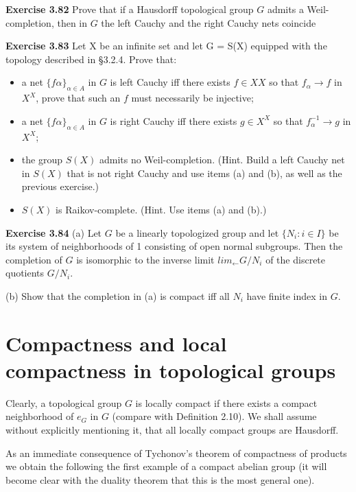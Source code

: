 \documentclass[12pt]{article}
\begin{document}
\textbf{Exercise 3.82} Prove that if a Hausdorff topological group $G$ admits a Weil-completion, then in $G$ the left
Cauchy and the right Cauchy nets coincide


\textbf{Exercise 3.83} Let X be an infinite set and let G = S(X) equipped with the topology described in §3.2.4. Prove
that:


\begin{itemize}

    \item a net  $\{f\alpha\}_{\alpha \in A}$ in $G$ is left Cauchy iff there exists $f \in XX$ so that $f_\alpha \to f$ in $X^X$, prove that such an $f$
    must necessarily be injective;
    
    \item  a net $\{f\alpha\}_{\alpha \in A}$ in $G$ is right Cauchy iff there exists $g \in X^X$ so that $f^{-1}_\alpha\to g$ in $X^X$;

    \item  the group $S(X)$ admits no Weil-completion. (Hint. Build a left Cauchy net in $S(X)$ that is not right
    Cauchy and use items (a) and (b), as well as the previous exercise.)

    \item $S(X)$ is Raikov-complete. (Hint. Use items (a) and (b).)
    

\end{itemize}


\textbf{Exercise 3.84} (a) Let $G$ be a linearly topologized group and let $\{N_i: i \in I\}$ be its system of neighborhoods
of 1 consisting of open normal subgroups. Then the completion of $G$ is isomorphic to the inverse limit
$lim_{\leftarrow} G/N_i$ of the discrete quotients $G/N_i$.


(b) Show that the completion in (a) is compact iff all $N_i$ have finite index in $G$.


\section{Compactness and local compactness in topological groups}


    Clearly, a topological group $G$ is locally compact if there exists a compact neighborhood of $e_G$ in $G$ (compare
with Definition 2.10). We shall assume without explicitly mentioning it, that all locally compact groups are
Hausdorff.


    As an immediate consequence of Tychonov's theorem of compactness of products we obtain the following
the first example of a compact abelian group (it will become clear with the duality theorem that this is the
most general one).
\end{document}
